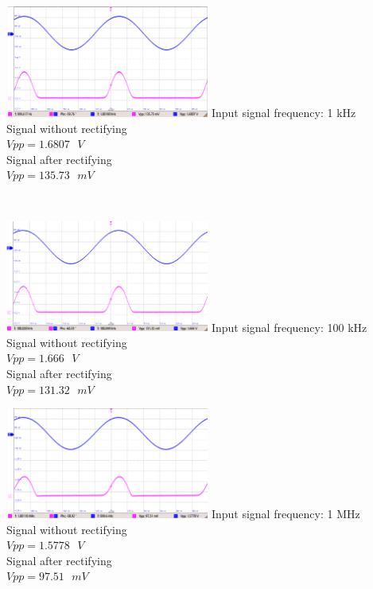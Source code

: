 \documentclass[12pt,a4paper,bold]{thesis}
\theoremstyle{thm}
\theoremstyle{definition}
\begin{document}
\begin{minipage}[b]{0.48\linewidth}
\includegraphics[width=6.7cm]{Images/Amazon/LF1kHz.png}  
Input signal frequency: 1 kHz\\
Signal without rectifying\\
$Vpp = 1.6807\text{ }V$\\
Signal after rectifying\\
$Vpp = 135.73\text{ }mV$\\
\end{minipage}
\\
\begin{minipage}[b]{0.48\linewidth}
\includegraphics[width=6.7cm]{Images/Amazon/LF100kHz.png}  
Input signal frequency: 100 kHz\\
Signal without rectifying\\
$Vpp = 1.666\text{ }V$\\
Signal after rectifying\\
$Vpp = 131.32\text{ }mV$\\
\end{minipage}
\hfill
\begin{minipage}[b]{0.48\linewidth}
\includegraphics[width=6.7cm]{Images/Amazon/LF1MHz.png}  
Input signal frequency: 1 MHz\\
Signal without rectifying\\
$Vpp = 1.5778\text{ }V$\\
Signal after rectifying\\
$Vpp = 97.51\text{ }mV$\\
\end{minipage}
\end{document}
